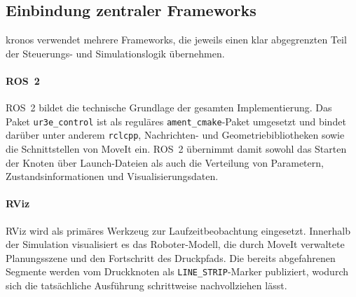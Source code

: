         \subsection{Einbindung zentraler Frameworks}
            \ac{kronos} verwendet mehrere Frameworks,
            die jeweils einen klar abgegrenzten Teil der Steuerungs- und Simulationslogik übernehmen.
            \paragraph{ROS~2}
            ROS~2 bildet die technische Grundlage der gesamten Implementierung.
            Das Paket \texttt{ur3e\_control} ist als reguläres \texttt{ament\_cmake}-Paket umgesetzt und bindet darüber unter anderem \texttt{rclcpp},
            Nachrichten- und Geometriebibliotheken sowie die Schnittstellen von MoveIt ein.
            ROS~2 übernimmt damit sowohl das Starten der Knoten über Launch-Dateien als auch die Verteilung von Parametern,
            Zustandsinformationen und Visualisierungsdaten.

            \paragraph{RViz}
            RViz wird als primäres Werkzeug zur Laufzeitbeobachtung eingesetzt.
            Innerhalb der Simulation visualisiert es das Roboter-Modell,
            die durch MoveIt verwaltete Planungsszene und den Fortschritt des Druckpfads.
            Die bereits abgefahrenen Segmente werden vom Druckknoten als \texttt{LINE\_STRIP}-Marker publiziert,
            wodurch sich die tatsächliche Ausführung schrittweise nachvollziehen lässt.

